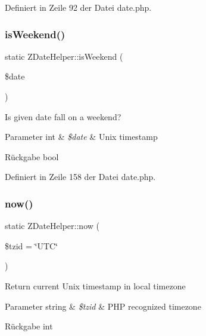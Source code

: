 Definiert in Zeile 92 der Datei date.\+php.

\mbox{\label{class_z_date_helper_a8b7c2fb18fe8636c447968640551aa7c}} 
\subsubsection{\texorpdfstring{is\+Weekend()}{isWeekend()}}
{\footnotesize\ttfamily static Z\+Date\+Helper\+::is\+Weekend (\begin{DoxyParamCaption}\item[{}]{\$date }\end{DoxyParamCaption})\hspace{0.3cm}{\ttfamily [static]}}

Is given date fall on a weekend?


\begin{DoxyParams}[1]{Parameter}
int & {\em \$date} & Unix timestamp\\
\hline
\end{DoxyParams}
\begin{DoxyReturn}{Rückgabe}
bool 
\end{DoxyReturn}


Definiert in Zeile 158 der Datei date.\+php.

\mbox{\label{class_z_date_helper_a6122b39577d89c503d1c20a445fc1eff}} 
\subsubsection{\texorpdfstring{now()}{now()}}
{\footnotesize\ttfamily static Z\+Date\+Helper\+::now (\begin{DoxyParamCaption}\item[{}]{\$tzid = {\ttfamily \char`\"{}UTC\char`\"{}} }\end{DoxyParamCaption})\hspace{0.3cm}{\ttfamily [static]}}

Return current Unix timestamp in local timezone


\begin{DoxyParams}[1]{Parameter}
string & {\em \$tzid} & P\+HP recognized timezone\\
\hline
\end{DoxyParams}
\begin{DoxyReturn}{Rückgabe}
int 
\end{DoxyReturn}


